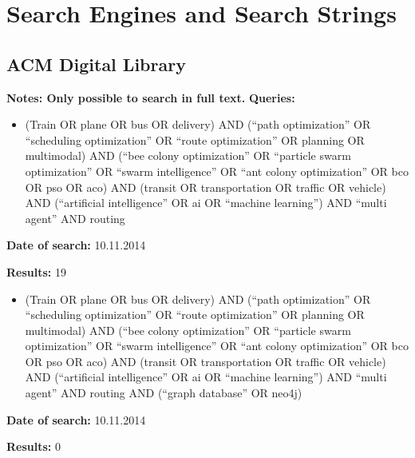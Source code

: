 \chapter{Search Engines and Search Strings}
\section{ACM Digital Library}
\textbf{Notes: Only possible to search in full text.} 
\newline
\newline
\textbf{Queries:}
\begin{itemize}
\item (Train OR plane OR bus OR delivery) AND (``path optimization'' OR ``scheduling optimization'' OR ``route optimization'' OR planning OR multimodal) AND (``bee colony optimization'' OR ``particle swarm optimization'' OR ``swarm intelligence'' OR ``ant colony optimization'' OR bco OR pso OR aco) AND (transit OR transportation OR traffic OR vehicle) AND (``artificial intelligence'' OR ai OR ``machine learning'') AND ``multi agent'' AND routing
\end{itemize}
\par \textbf{Date of search:} 10.11.2014
\par \textbf{Results:} 19
\begin{itemize}
\item (Train OR plane OR bus OR delivery) AND (``path optimization'' OR ``scheduling optimization'' OR ``route optimization'' OR planning OR multimodal) AND (``bee colony optimization'' OR ``particle swarm optimization'' OR ``swarm intelligence'' OR ``ant colony optimization'' OR bco OR pso OR aco) AND (transit OR transportation OR traffic OR vehicle) AND (``artificial intelligence'' OR ai OR ``machine learning'') AND ``multi agent'' AND routing AND (``graph database'' OR neo4j)
\end{itemize}
\par \textbf{Date of search:} 10.11.2014
\par \textbf{Results:} 0


